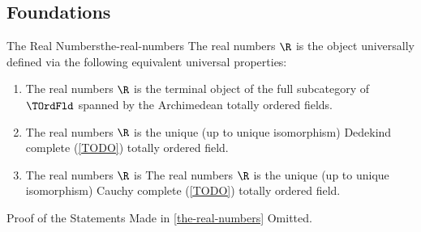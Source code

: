 \subsection{Foundations}\label{subsection-foundations}
\begin{definition}{The Real Numbers}{the-real-numbers}%
    The real numbers $\R$ is the object universally defined via the following equivalent universal properties:
    \begin{enumerate}
        \item\label{the-real-numbers-characterisation-1}The real numbers $\R$ is the terminal object of the full subcategory of $\TOrdFld$ spanned by the Archimedean totally ordered fields.
        \item\label{the-real-numbers-characterisation-2}The real numbers $\R$ is the unique (up to unique isomorphism) Dedekind complete (\cref{TODO}) totally ordered field.
        \item\label{the-real-numbers-characterisation-3}The real numbers $\R$ is The real numbers $\R$ is the unique (up to unique isomorphism) Cauchy complete (\cref{TODO}) totally ordered field.
    \end{enumerate}
\end{definition}
\begin{Proof}{Proof of the Statements Made in \cref{the-real-numbers}}%
    Omitted.
\end{Proof}
